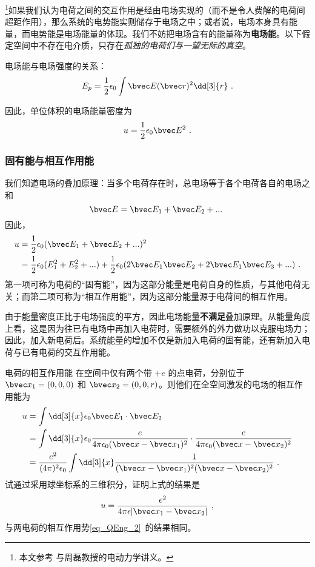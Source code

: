

\footnote{本文参考 \cite{GriffE} 与周磊教授的电动力学讲义。}如果我们认为电荷之间的交互作用是经由电场实现的（而不是令人费解的电荷间超距作用），那么系统的电势能实则储存于电场之中；或者说，电场本身具有能量，而电势能是电场能量的体现。我们不妨把电场含有的能量称为\textbf{电场能}。以下假定空间中不存在电介质，只存在\textsl{孤独的电荷们与一望无际的真空}。

电场能与电场强度的关系：
\begin{equation}\label{eq_EEng_2}
E_p = \frac12 \epsilon_0 \int \bvec E(\bvec r)^2 \dd[3]{r}~.
\end{equation}

因此，单位体积的电场能量密度为
\begin{equation}
u = \frac12 \epsilon_0 \bvec E^2~.
\end{equation}

\subsubsection{固有能与相互作用能}
我们知道电场的叠加原理：当多个电荷存在时，总电场等于各个电荷各自的电场之和
$$
\bvec E = \bvec E_1 + \bvec E_2 +... ~
$$
因此，
$$
\begin{aligned}
u &= \frac12 \epsilon_0 (\bvec E_1 + \bvec E_2 +... )^2\\
&=\frac12 \epsilon_0(E_1^2+E_2^2+...)+\frac12 \epsilon_0 (2\bvec E_1 \bvec E_2+2\bvec E_1 \bvec E_3+...)~.
\end{aligned}
$$
第一项可称为电荷的“固有能”，因为这部分能量是电荷自身的性质，与其他电荷无关；而第二项可称为“相互作用能”，因为这部分能量源于电荷间的相互作用。

由于能量密度正比于电场强度的平方，因此电场能量\textbf{不满足}叠加原理。从能量角度上看，这是因为往已有电场中再加入电荷时，需要额外的外力做功以克服电场力；因此，加入新电荷后。系统能量的增加不仅是新加入电荷的固有能，还有新加入电荷与已有电荷的交互作用能。
\begin{exercise}{电荷的相互作用能}
在空间中仅有两个带 $+e$ 的点电荷，分别位于 $\bvec x_1=(0,0,0)$ 和 $\bvec x_2=(0,0,r)$。则他们在全空间激发的电场的相互作用能为
\begin{equation}
\begin{aligned}
u&=\int \dd[3]{x} \epsilon_0 \bvec E_1\cdot \bvec E_2\\
&=\int \dd[3]{x} \epsilon_0 \frac{e}{4\pi\epsilon_0(\bvec x-\bvec x_1)^2}\cdot \frac{e}{4\pi\epsilon_0(\bvec x-\bvec x_2)^2}\\
&=\frac{e^2}{(4\pi)^2\epsilon_0} \int\dd[3]{x} \frac{1}{(\bvec x-\bvec x_1)^2(\bvec x-\bvec x_2)^2}~.
\end{aligned}
\end{equation}
试通过采用球坐标系的三维积分，证明上式的结果是
\begin{equation}
u=\frac{e^2}{4\pi \epsilon|\bvec x_1-\bvec x_2|}~,
\end{equation}
与两电荷的相互作用势\autoref{eq_QEng_2}~的结果相同。
\end{exercise}

